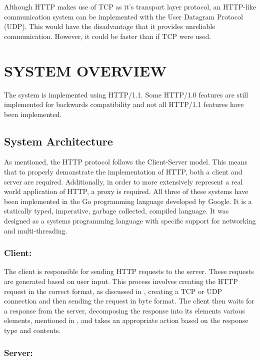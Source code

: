 \documentclass[10pt,twocolumn]{witseiepaper}
\begin{document}
	Although HTTP makes use of TCP as it's transport layer protocol, an HTTP-like communication system can be implemented with the User Datagram Protocol (UDP). This would have the disadvantage that it provides unreliable communication. However, it could be faster than if TCP were used.

\section{SYSTEM OVERVIEW} \label{sysover}

The system is implemented using HTTP/1.1. Some HTTP/1.0 features are still implemented for backwards compatibility and not all HTTP/1.1 features have been implemented.

	\subsection{System Architecture}

	As mentioned, the HTTP protocol follows the Client-Server model. This means that to properly demonstrate the implementation of HTTP, both a client and server are required. Additionally, in order to more extensively represent a real world application of HTTP, a proxy is required. All three of these systems have been implemented in the Go programming language developed by Google. It is a statically typed, imperative, garbage collected, compiled language. It was designed as a systems programming language with specific support for networking and multi-threading.

	\subsubsection{Client:}

	The client is responsible for sending HTTP requests to the server. These requests are generated based on user input. This process involves creating the HTTP request in the correct format, as discussed in , creating a TCP or UDP connection and then sending the request in byte format. The client then waits for a response from the server, decomposing the response into its elements various elements, mentioned in , and takes an appropriate action based on the response type and contents.

	\subsubsection{Server:}
\end{document}
